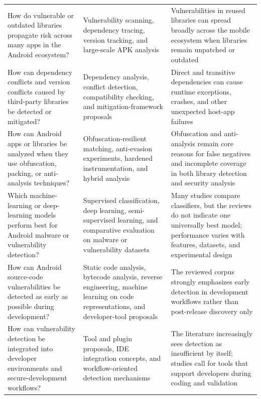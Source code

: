 \documentclass[12pt,a4paper]{report}
\begin{document}
{\begin{longtable}{>{\raggedright\arraybackslash}p{}>{\raggedright\arraybackslash}p{}>{\raggedright\arraybackslash}p{}}
How do vulnerable or outdated libraries propagate risk across many apps in the Android ecosystem? \parencite{zhanResearchThirdPartyLibraries2022} & Vulnerability scanning, dependency tracing, version tracking, and large-scale APK analysis & Vulnerabilities in reused libraries can spread broadly across the mobile ecosystem when libraries remain unpatched or outdated \\

How can dependency conflicts and version conflicts caused by third-party libraries be detected or mitigated? \parencite{zhanResearchThirdPartyLibraries2022} & Dependency analysis, conflict detection, compatibility checking, and mitigation-framework proposals & Direct and transitive dependencies can cause runtime exceptions, crashes, and other unexpected host-app failures \\

How can Android apps or libraries be analyzed when they use obfuscation, packing, or anti-analysis techniques? \parencite{zhanResearchThirdPartyLibraries2022,sutterDynamicSecurityAnalysis2024,dahiyaAndroidMalwareAnalysis2025} & Obfuscation-resilient matching, anti-evasion experiments, hardened instrumentation, and hybrid analysis & Obfuscation and anti-analysis remain core reasons for false negatives and incomplete coverage in both library detection and security analysis \\

Which machine-learning or deep-learning models perform best for Android malware or vulnerability detection? \parencite{dahiyaAndroidMalwareAnalysis2025,senanayakeAndroidSourceCode2023,zakeyaProbingAndroVulDataset2022} & Supervised classification, deep learning, semi-supervised learning, and comparative evaluation on malware or vulnerability datasets & Many studies compare classifiers, but the reviews do not indicate one universally best model; performance varies with features, datasets, and experimental design \\

How can Android source-code vulnerabilities be detected as early as possible during development? \parencite{senanayakeAndroidSourceCode2023} & Static code analysis, bytecode analysis, reverse engineering, machine learning on code representations, and developer-tool proposals & The reviewed corpus strongly emphasizes early detection in development workflows rather than post-release discovery only \\

How can vulnerability detection be integrated into developer environments and secure-development workflows? \parencite{senanayakeAndroidSourceCode2023} & Tool and plugin proposals, IDE integration concepts, and workflow-oriented detection mechanisms & The literature increasingly sees detection as insufficient by itself; studies call for tools that support developers during coding and validation \\


\end{longtable}}
\end{document}
